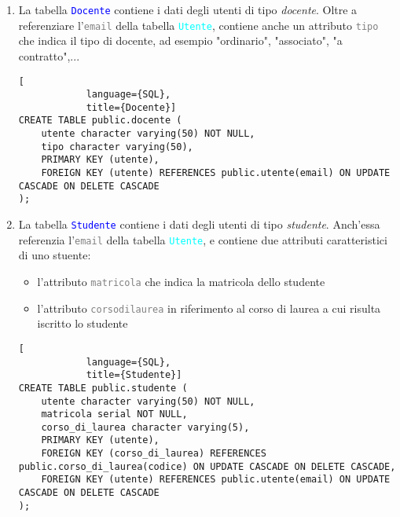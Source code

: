 \documentclass{article}
\newcommand{\tabb}[1]{\texttt{\textcolor{blue}{#1}}}
\newcommand{\tab}[1]{\texttt{\textcolor{cyan}{#1}}}
\newcommand{\attr}[1]{\texttt{\textcolor{gray}{#1}}}
\newcommand{\und}[0]{\textunderscore}
\begin{document}
\begin{enumerate}
        \item La tabella \tabb{Docente} contiene i dati degli utenti di tipo \textit{docente}. Oltre a referenziare l'\attr{email} della tabella \tab{Utente}, contiene anche un attributo \attr{tipo} che indica il tipo di docente, ad esempio "ordinario", "associato", "a contratto",...
        \begin{lstlisting}[
            language={SQL},
            title={Docente}]
CREATE TABLE public.docente (
    utente character varying(50) NOT NULL,
    tipo character varying(50),
    PRIMARY KEY (utente),
    FOREIGN KEY (utente) REFERENCES public.utente(email) ON UPDATE CASCADE ON DELETE CASCADE
);
        \end{lstlisting}

        \item La tabella \tabb{Studente} contiene i dati degli utenti di tipo \textit{studente}. Anch'essa referenzia l'\attr{email} della tabella \tab{Utente}, e contiene due attributi caratteristici di uno stuente:
        \begin{itemize}
            \item l'attributo \attr{matricola} che indica la matricola dello studente
            \item l'attributo \attr{corso\und di\und laurea} in riferimento al corso di laurea a cui risulta iscritto lo studente
        \end{itemize}
        \begin{lstlisting}[
            language={SQL},
            title={Studente}]
CREATE TABLE public.studente (
    utente character varying(50) NOT NULL,
    matricola serial NOT NULL,
    corso_di_laurea character varying(5),
    PRIMARY KEY (utente),
    FOREIGN KEY (corso_di_laurea) REFERENCES public.corso_di_laurea(codice) ON UPDATE CASCADE ON DELETE CASCADE,
    FOREIGN KEY (utente) REFERENCES public.utente(email) ON UPDATE CASCADE ON DELETE CASCADE
);
        \end{lstlisting}

        \pagebreak


\end{enumerate}
\end{document}
